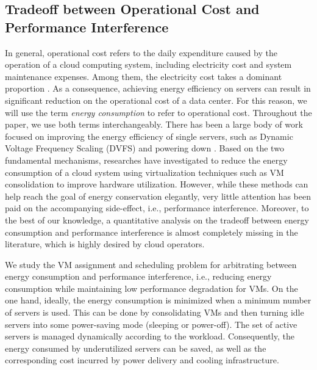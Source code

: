 \documentclass[10pt,journal]{IEEEtran}
\begin{document}
\subsection{Tradeoff between Operational Cost and Performance Interference}

In general, operational cost refers to the daily expenditure caused by the operation of a cloud computing system, including electricity cost and system maintenance expenses. Among them, the electricity cost takes a dominant proportion \cite{Hamilton09, Amokrane2013}. As a consequence, achieving energy efficiency on servers can result in significant reduction on the operational cost of a data center. For this reason, we will use the term \emph{energy consumption} to refer to operational cost. Throughout the paper, we use both terms interchangeably. There has been a large body of work focused on improving the energy efficiency of single servers, such as Dynamic Voltage Frequency Scaling (DVFS) and powering down \cite{Albers10}. Based on the two fundamental mechanisms, researches have investigated to reduce the energy consumption of a cloud system using virtualization techniques such as VM consolidation to improve hardware utilization. However, while these methods can help reach the goal of energy conservation elegantly, very little attention has been paid on the accompanying side-effect, i.e., performance interference. Moreover, to the best of our knowledge, a quantitative analysis on the tradeoff between energy consumption and performance interference is almost completely missing in the literature, which is highly desired by cloud operators.

We study the VM assignment and scheduling problem for arbitrating between energy consumption and performance interference, i.e., reducing energy consumption while maintaining low performance degradation for VMs. On the one hand, ideally, the energy consumption is minimized when a minimum number of servers is used. This can be done by consolidating VMs and then turning idle servers into some power-saving mode (sleeping or power-off). The set of active servers is managed dynamically according to the workload. Consequently, the energy consumed by underutilized servers can be saved, as well as the corresponding cost incurred by power delivery and cooling infrastructure. 
\end{document}
